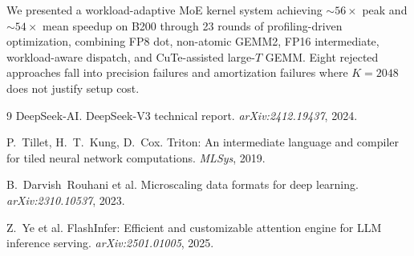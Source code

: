 \documentclass[11pt,twocolumn]{article}
\begin{document}
We presented a workload-adaptive MoE kernel system achieving ${\sim}56\times$ peak and ${\sim}54\times$ mean speedup on B200 through 23 rounds of profiling-driven optimization, combining FP8 dot, non-atomic GEMM2, FP16 intermediate, workload-aware dispatch, and CuTe-assisted large-$T$ GEMM.
Eight rejected approaches fall into precision failures and amortization failures where $K{=}2048$ does not justify setup cost.

\begin{thebibliography}{9}
\small
{}
DeepSeek-AI. DeepSeek-V3 technical report. \emph{arXiv:2412.19437}, 2024.

P.~Tillet, H.~T.~Kung, D.~Cox. Triton: An intermediate language and compiler for tiled neural network computations. \emph{MLSys}, 2019.

B.~Darvish~Rouhani et al. Microscaling data formats for deep learning. \emph{arXiv:2310.10537}, 2023.

Z.~Ye et al. FlashInfer: Efficient and customizable attention engine for LLM inference serving. \emph{arXiv:2501.01005}, 2025.

\end{thebibliography}
\end{document}

